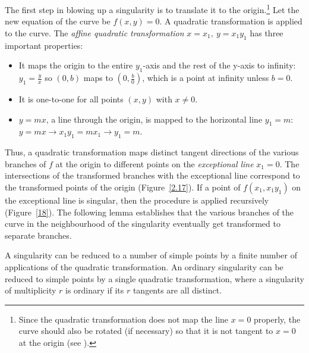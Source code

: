 The first step in blowing up a singularity is to translate it to the 
origin.\footnote{Since the quadratic transformation does not map the line $x=0$ 
	properly, the curve should also be rotated (if necessary) so that it is 
	not tangent to $x=0$ at the origin (see \cite{jj}).}
Let the new equation of the curve be $f(x,y)=0$.
A quadratic transformation is applied to the curve.
The {\em affine quadratic transformation} $x = x_{1},\ y = x_{1}y_{1}$
\cite{walker} has three important properties:
\begin{itemize}
\item
It maps the origin to the entire $y_{1}$-axis and the rest of 
the y-axis to infinity: $y_{1} = \frac{y}{x}$ so $(0,b)$ maps to 
$(0,\frac{b}{0})$, which is a point at infinity unless $b=0$.
\item
It is one-to-one for all points $(x,y)$ with $x \neq 0$.
\item
$y = mx$, a line  through the origin, is mapped to the horizontal line $y_{1}=m$:
$y=mx \rightarrow  x_{1}y_{1} = mx_{1}  \rightarrow  y_{1}=m$.
\end{itemize}
Thus, a quadratic transformation maps distinct tangent directions of the
various branches of $f$ at the origin to different points on the 
{\em exceptional line} $x_{1} =0$.
The intersections of the transformed branches with the exceptional line
correspond to the transformed points of the origin (Figure~\ref{2.17}).
If a point of $f(x_{1},x_{1}y_{1})$ on the exceptional line is singular, 
then the procedure is applied recursively (Figure~\ref{18}).
The following lemma establishes that the various branches of the curve 
in the neighbourhood of the singularity eventually get transformed to separate 
branches.



\begin{lemma}
A singularity can be reduced to a number of simple points by 
a finite number of applications of the quadratic transformation.
An ordinary singularity can be reduced to simple points by a 
single quadratic transformation, where a singularity of multiplicity 
$r$ is ordinary if its $r$ tangents are all distinct.
\end{lemma}


